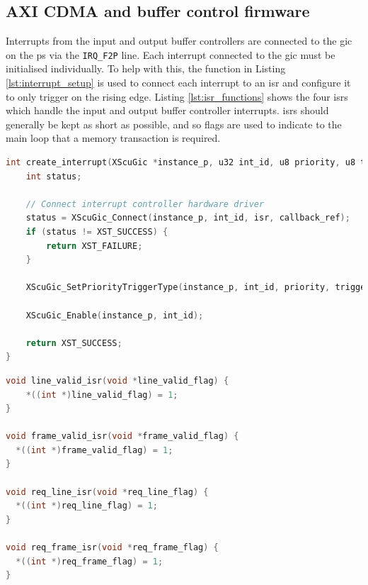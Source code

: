 \subsection{AXI CDMA and buffer control firmware}
Interrupts from the input and output buffer controllers are connected to the \gls{gic} on the \gls{ps} via the \texttt{IRQ\_F2P} line. Each interrupt connected to the \gls{gic} must be initialised individually. To help with this, the function in Listing \ref{lst:interrupt_setup} is used to connect each interrupt to an \gls{isr} and configure it to only trigger on the rising edge. Listing \ref{lst:isr_functions} shows the four \glspl{isr} which handle the input and output buffer controller interrupts. \glspl{isr} should generally be kept as short as possible, and so flags are used to indicate to the main loop that a memory transaction is required.

\begin{lstlisting}[caption={Interrupt setup function}, label={lst:interrupt_setup}, language=C]
int create_interrupt(XScuGic *instance_p, u32 int_id, u8 priority, u8 trigger, Xil_InterruptHandler isr, void *callback_ref) {
    int status;

    // Connect interrupt controller hardware driver
    status = XScuGic_Connect(instance_p, int_id, isr, callback_ref);
    if (status != XST_SUCCESS) {
        return XST_FAILURE;
    }

    XScuGic_SetPriorityTriggerType(instance_p, int_id, priority, trigger);

    XScuGic_Enable(instance_p, int_id);

    return XST_SUCCESS;
}
\end{lstlisting}

\begin{lstlisting}[caption={\glspl{isr} for handling buffer controller interrupts.}, label={lst:isr_functions}, language=C]
void line_valid_isr(void *line_valid_flag) {
    *((int *)line_valid_flag) = 1;
}

void frame_valid_isr(void *frame_valid_flag) {
  *((int *)frame_valid_flag) = 1;
}

void req_line_isr(void *req_line_flag) {
  *((int *)req_line_flag) = 1;
}

void req_frame_isr(void *req_frame_flag) {
  *((int *)req_frame_flag) = 1;
}
\end{lstlisting}

